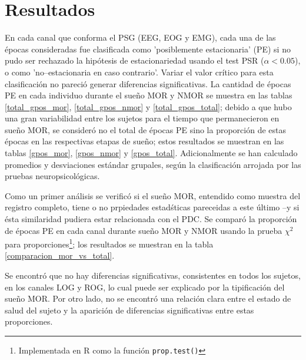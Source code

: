 \chapter{Resultados}

En cada canal que conforma el PSG (EEG, EOG y EMG), cada una de las \'epocas consideradas fue 
clasificada como 'posiblemente estacionaria' (PE) si no pudo ser rechazado la hip\'otesis de 
estacionariedad usando el test PSR ($\alpha < 0.05$), o como 'no--estacionaria en caso contrario'.
Variar el valor cr\'itico para esta clasificaci\'on no pareci\'o generar diferencias significativas.
La cantidad de \'epocas PE en cada individuo durante el sue\~no MOR y NMOR se muestra en las tablas 
\ref{total_gpos_mor}, \ref{total_gpos_nmor} y \ref{total_gpos_total}; debido a que hubo una gran 
variabilidad entre los sujetos para el tiempo que permanecieron en sue\~no MOR, se consider\'o no 
el total de \'epocas PE sino la proporci\'on de estas \'epocas en las respectivas etapas de sue\~no; 
estos resultados se muestran en las tablas \ref{gpos_mor}, \ref{gpos_nmor} y \ref{gpos_total}. 
Adicionalmente se han calculado promedios y desviaciones est\'andar grupales, seg\'un la
clasificaci\'on arrojada por las pruebas neuropsicol\'ogicas.

Como un primer an\'alisis se verific\'o si el sue\~no MOR, entendido como muestra del registro
completo, tiene o no prpiedades estad\'sticas pareceidas a este \'ultimo --y si \'esta similaridad 
pudiera estar relacionada con el PDC. 
Se compar\'o la proporci\'on de \'epocas PE en cada canal durante sue\~no MOR y NMOR usando la 
prueba $\chi^{2}$ para proporciones\footnote{Implementada en R como la funci\'on 
\texttt{prop.test()}}; los resultados se muestran en la tabla \ref{comparacion_mor_vs_total}.

Se encontr\'o que no hay diferencias significativas, consistentes en todos los sujetos, en los 
canales LOG y ROG, lo cual puede ser explicado por la tipificaci\'on del sue\~no MOR. 
Por otro lado, no se encontr\'o una relaci\'on clara entre el estado de salud del sujeto y la 
aparici\'on de diferencias significativas entre estas proporciones.

